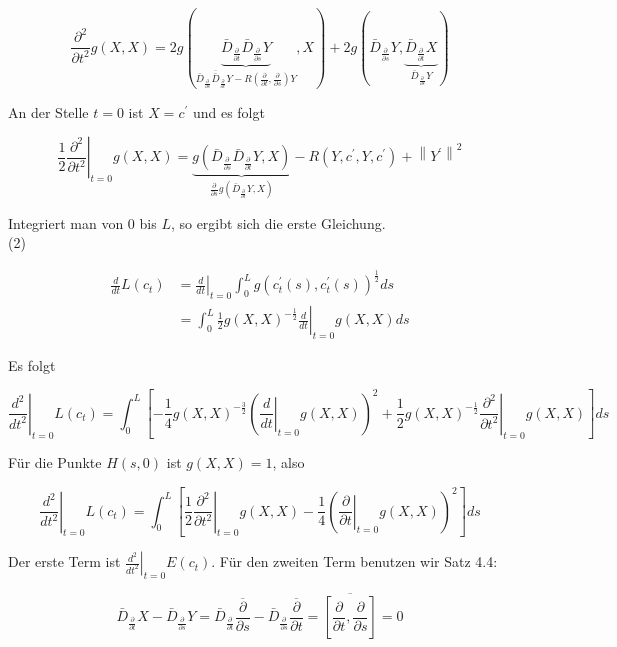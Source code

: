 \documentclass[10pt, letterpaper]{article}
\begin{document}
$$
\frac{\partial^{2}}{\partial t^{2}} g(X, X)=2 g(\underbrace{\bar{D}_{\frac{\partial}{\partial t}} \bar{D}_{\frac{\partial}{\partial s}} Y}_{\bar{D}_{\frac{\partial}{\partial s}} \overline{\bar{D}}_{\frac{\partial}{\partial t}} Y-R\left(\frac{\partial}{\partial t}, \frac{\partial}{\partial s}\right) Y}, X)+2 g(\bar{D}_{\frac{\partial}{\partial s}} Y, \underbrace{\bar{D}_{\frac{\partial}{\partial t}} X}_{\bar{D}_{\frac{\partial}{\partial s}} Y})
$$

An der Stelle $t=0$ ist $X=c^{\prime}$ und es folgt

$$
\left.\frac{1}{2} \frac{\partial^{2}}{\partial t^{2}}\right|_{t=0} g(X, X)=\underbrace{g\left(\bar{D}_{\frac{\partial}{\partial s}} \bar{D}_{\frac{\partial}{\partial t}} Y, X\right)}_{\frac{\partial}{\partial s} g\left(\bar{D}_{\frac{\partial}{\partial t}} Y, X\right)}-R\left(Y, c^{\prime}, Y, c^{\prime}\right)+\left\|Y^{\prime}\right\|^{2}
$$

Integriert man von 0 bis $L$, so ergibt sich die erste Gleichung.\\
(2)

$$
\begin{aligned}
\frac{d}{d t} L\left(c_{t}\right) & =\left.\frac{d}{d t}\right|_{t=0} \int_{0}^{L} g\left(c_{t}^{\prime}(s), c_{t}^{\prime}(s)\right)^{\frac{1}{2}} d s \\
& =\left.\int_{0}^{L} \frac{1}{2} g(X, X)^{-\frac{1}{2}} \frac{d}{d t}\right|_{t=0} g(X, X) d s
\end{aligned}
$$

Es folgt

$$
\left.\frac{d^{2}}{d t^{2}}\right|_{t=0} L\left(c_{t}\right)=\int_{0}^{L}\left[-\frac{1}{4} g(X, X)^{-\frac{3}{2}}\left(\left.\frac{d}{d t}\right|_{t=0} g(X, X)\right)^{2}+\left.\frac{1}{2} g(X, X)^{-\frac{1}{2}} \frac{\partial^{2}}{\partial t^{2}}\right|_{t=0} g(X, X)\right] d s
$$

Für die Punkte $H(s, 0)$ ist $g(X, X)=1$, also

$$
\left.\frac{d^{2}}{d t^{2}}\right|_{t=0} L\left(c_{t}\right)=\int_{0}^{L}\left[\left.\frac{1}{2} \frac{\partial^{2}}{\partial t^{2}}\right|_{t=0} g(X, X)-\frac{1}{4}\left(\left.\frac{\partial}{\partial t}\right|_{t=0} g(X, X)\right)^{2}\right] d s
$$

Der erste Term ist $\left.\frac{d^{2}}{d t^{2}}\right|_{t=0} E\left(c_{t}\right)$. Für den zweiten Term benutzen wir Satz 4.4:

$$
\bar{D}_{\frac{\partial}{\partial t}} X-\bar{D}_{\frac{\partial}{\partial s}} Y=\bar{D}_{\frac{\partial}{\partial t}} \overline{\frac{\partial}{\partial s}}-\bar{D}_{\frac{\partial}{\partial s}} \overline{\frac{\partial}{\partial t}}=\overline{\left[\frac{\partial}{\partial t}, \frac{\partial}{\partial s}\right]}=0
$$
\end{document}
